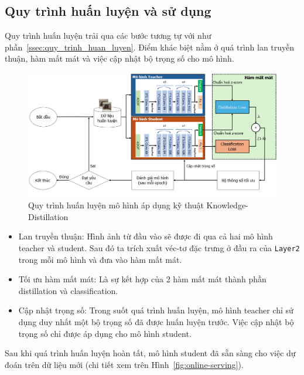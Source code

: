 \subsection{Quy trình huấn luyện và sử dụng}
%
Quy trình huấn luyện trải qua các bước tương tự với như phần~\ref{ssec:quy_trinh_huan_luyen}.
%
Điểm khác biệt nằm ở quá trình lan truyền thuận, hàm mất mát và việc cập nhật bộ trọng số cho mô hình.
%
%
\begin{figure}[h!]
	\centering
	\includegraphics[width=1.0\linewidth]{Images/offline-training-process-distillation.png}
	\begin{minipage}{1.0\linewidth}
		\vspace{5mm}
		\caption{Quy trình huấn luyện mô hình áp dụng kỹ thuật Knowledge-Distillation}
		\label{fig:offline-training-process-distillation}
	\end{minipage}
\end{figure}
%
\begin{itemize}
	\item Lan truyền thuận: Hình ảnh từ đầu vào sẽ được đi qua cả hai mô hình \gls{teacher} và \gls{student}. Sau đó ta trích xuất véc-tơ đặc trưng ở đầu ra của \texttt{Layer2} trong mỗi mô hình và đưa vào hàm mất mát.
	
	\item  Tối ưu hàm mất mát: Là sự kết hợp của 2 hàm mất mát thành phần \gls{distillation} và \gls{classification}.
	
	\item Cập nhật trọng số: Trong suốt quá trình huấn luyện, mô hình \gls{teacher} chỉ sử dụng duy nhất một bộ trọng số đã được huấn luyện trước. Việc cập nhật bộ trọng số chỉ được áp dụng cho mô hình \gls{student}.
\end{itemize}

Sau khi quá trình huấn luyện hoàn tất, mô hình \gls{student} đã sẵn sàng cho việc dự đoán trên dữ liệu mới (chi tiết xem trên Hình~\ref{fig:online-serving}). 







